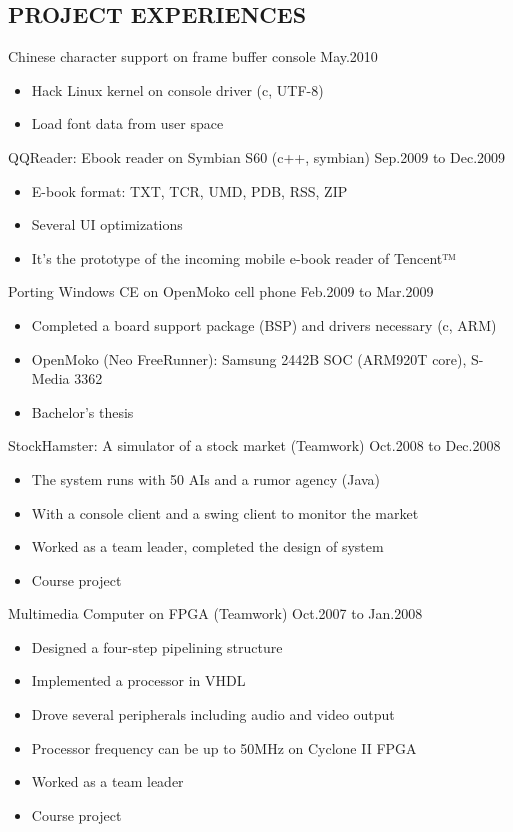 \documentclass[11pt]{res} %
\begin{document}
\begin{resume}
\section{PROJECT EXPERIENCES}
Chinese character support on frame buffer console \hfill May.2010

\begin{itemize} \itemsep -2pt
\item Hack Linux kernel on console driver (c, UTF-8)
\item Load font data from user space
\end{itemize}

QQReader: Ebook reader on Symbian S60  (c++, symbian) \hfill Sep.2009 to Dec.2009

\begin{itemize} \itemsep -2pt
\item E-book format: TXT, TCR, UMD, PDB, RSS, ZIP
\item Several UI optimizations
\item It's the prototype of the incoming mobile e-book reader of Tencent™
\end{itemize}

Porting Windows CE on OpenMoko cell phone \hfill Feb.2009 to Mar.2009

\begin{itemize} \itemsep -2pt
\item Completed a board support package (BSP) and drivers necessary (c, ARM)
\item OpenMoko (Neo FreeRunner): Samsung 2442B SOC (ARM920T core), S-Media 3362
\item Bachelor's thesis
\end{itemize}

StockHamster: A simulator of a stock market (Teamwork) \hfill Oct.2008 to Dec.2008

\begin{itemize} \itemsep -2pt
\item The system runs with 50 AIs and a rumor agency (Java)
\item With a console client and a swing client to monitor the market
\item Worked as a team leader, completed the design of system
\item Course project
\end{itemize}

Multimedia Computer on FPGA (Teamwork) \hfill Oct.2007 to Jan.2008

\begin{itemize} \itemsep -2pt
\item Designed a four-step pipelining structure
\item Implemented a processor in VHDL
\item Drove several peripherals including audio and video output
\item Processor frequency can be up to 50MHz on Cyclone II FPGA
\item Worked as a team leader
\item Course project
\end{itemize}


\end{resume}
\end{document}
